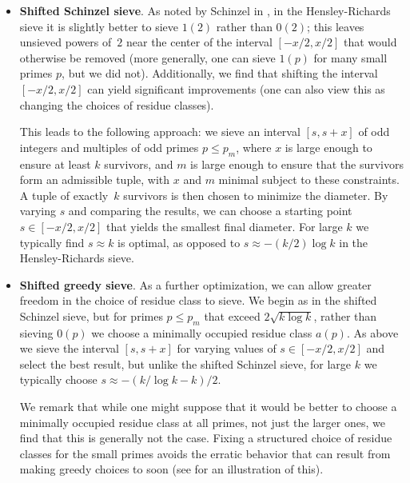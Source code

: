 \documentclass{bmcart}
\theoremstyle{plain}
\theoremstyle{definition}
\begin{document}
\begin{itemize}

\item\textbf{Shifted Schinzel sieve}.
As noted by Schinzel in \cite{schinzel}, in the Hensley-Richards sieve it is slightly better to sieve $1(2)$ rather than $0(2)$; this leaves unsieved powers of~$2$ near the center of the interval $[-x/2,x/2]$ that would otherwise be removed (more generally, one can sieve $1(p)$ for many small primes $p$, but we did not).
Additionally, we find that shifting the interval $[-x/2,x/2]$ can yield significant improvements (one can also view this as changing the choices of residue classes).

This leads to the following approach: we sieve an interval $[s,s+x]$ of odd integers and multiples of odd primes $p\le p_m$, where $x$ is large enough to ensure at least $k$ survivors, and $m$ is large enough to ensure that the survivors form an admissible tuple, with $x$ and $m$ minimal subject to these constraints.  A tuple of exactly~$k$ survivors is then chosen to minimize the diameter.  By varying $s$ and comparing the results, we can choose a starting point $s\in [-x/2,x/2]$ that yields the smallest final diameter.
For large $k$ we typically find $s\approx k$ is optimal, as opposed to $s\approx -(k/2)\log k$ in the Hensley-Richards sieve.
\smallbreak

\item\textbf{Shifted greedy sieve}.
As a further optimization, we can allow greater freedom in the choice of residue class to sieve.
We begin as in the shifted Schinzel sieve, but for primes $p \le p_m$ that exceed $2\sqrt{k\log k}$, rather than sieving $0(p)$ we choose a minimally occupied residue class $a(p)$.
As above we sieve the interval $[s,s+x]$ for varying values of $s\in [-x/2,x/2]$ and select the best result, but unlike the shifted Schinzel sieve, for large $k$ we typically choose $s\approx -(k/\log k - k)/2$.

We remark that while one might suppose that it would be better to choose a minimally occupied residue class at all primes, not just the larger ones, we find that this is generally not the case.  Fixing a structured choice of residue classes for the small primes avoids the erratic behavior that can result from making greedy choices to soon (see \cite[Fig. 1]{gordon} for an illustration of this).

\end{itemize}
\smallbreak
\end{document}
